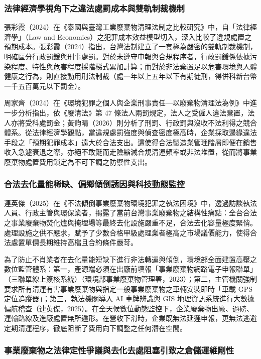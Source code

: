 \documentclass[12pt,a4paper]{article}
\begin{document}
\subsubsection{法律經濟學視角下之違法處罰成本與雙軌制裁機制}

張彩霞（2024）在《泰國與臺灣工業廢棄物清理法制之比較研究》中，自「法律經濟學」（Law and Economics）之犯罪成本效益模型切入，深入比較了違規處置之預期成本。張彩霞（2024）指出，台灣法制建立了一套極為嚴密的雙軌制裁機制，明確區分行政罰鍰與刑事處罰。對於未遵守申報與合規程序者，行政罰鍰係依據污染程度、特性與危害程度採階梯式累加計算；而對於非法棄置足以危害環境與人體健康之行為，則直接動用刑法制裁（處一年以上五年以下有期徒刑，得併科新台幣一千五百萬元以下罰金）。

周家齊（2024）在《環境犯罪之個人與企業刑事責任—以廢棄物清理法為例》中進一步分析指出，依《廢清法》第 47 條法人兩罰規定，法人之受僱人違法棄置，法人亦將受科處罰金；黃韵晴（2026）則分析了刑罰、行政罰與沒收不法利得之競合體系。從法律經濟學觀點，當違規處罰強度與偵查密度極高時，企業採取邊緣違法手段之「預期犯罪成本」遠大於合法支出。這使得合法製造業管理階層即便在銷售收入急遽衰退之際，亦絕不敢鋌而走險縮減合規清運頻率或非法堆置，從而將事業廢棄物處置費用鎖定為不可下調之防禦性支出。

\subsubsection{合法去化量能稀缺、偏鄉傾倒誘因與科技動態監控}

連英傑（2025）在《不法傾倒事業廢棄物環境犯罪之執法困境》中，透過訪談執法人員、行政主管與環保業者，揭露了當前台灣事業廢棄物之結構性痛點：全台合法之事業廢棄物焚化爐與掩埋場等最終去化設施嚴重不足，合法去化容量極度緊俏。處理設施之供不應求，賦予了少數合格甲級處理業者極高之市場議價能力，使得合法處置單價長期維持高檔且合約條件嚴苛。

為了防止不肖業者在去化量能短缺下進行非法轉運與傾倒，環境部全面建置高壓之數位監管體系：第一，產源端必須在出廠前填報「事業廢棄物網路電子申報聯單」（三聯單線上簽核系統）（環境部事業廢棄物管理署，2023）；第二，主管機關強制要求所有清運有害事業廢棄物與指定一般事業廢棄物之車輛安裝即時「車載 GPS 定位追蹤器」；第三，執法機關導入 AI 車牌辨識與 GIS 地理資訊系統進行大數據偏航稽查（連英傑，2025）。在全天候數位動態監控下，企業廢棄物出廠、過磅、運輸路線及進廠處置無所遁形。在營收下滑時，企業既無法延遲申報，更無法逃避定期清運程序，徹底阻斷了費用向下調整之任何潛在空間。

\subsubsection{事業廢棄物之法律定性爭議與去化去處阻塞引致之倉儲運維剛性}
\end{document}
